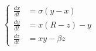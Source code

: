 \documentclass[preview,border=4pt]{standalone}
\begin{document}
\begin{equation}
\left\{ \begin{aligned}
\frac{dx}{dt} &= \sigma (y - x) \\
\frac{dy}{dt} &= x (R - z) - y \\
\frac{dz}{dt} &= xy - \beta z
\end{aligned} \right.
\end{equation}
\end{document}

